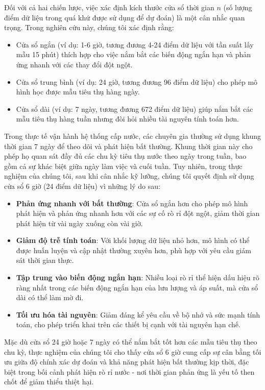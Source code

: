 Đối với cả hai chiến lược, việc xác định kích thước cửa sổ thời gian $n$ (số lượng điểm dữ liệu trong quá khứ được sử dụng để dự đoán) là một cân nhắc quan trọng. Trong nghiên cứu này, chúng tôi xác định rằng:

\begin{itemize}
    \item Cửa sổ ngắn (ví dụ: 1-6 giờ, tương đương 4-24 điểm dữ liệu với tần suất lấy mẫu 15 phút) thích hợp cho việc nắm bắt các biến động ngắn hạn và phản ứng nhanh với các thay đổi đột ngột.
    \item Cửa sổ trung bình (ví dụ: 24 giờ, tương đương 96 điểm dữ liệu) cho phép mô hình học được mẫu tiêu thụ hàng ngày.
    \item Cửa sổ dài (ví dụ: 7 ngày, tương đương 672 điểm dữ liệu) giúp nắm bắt các mẫu tiêu thụ hàng tuần nhưng đòi hỏi nhiều tài nguyên tính toán hơn.
\end{itemize}

Trong thực tế vận hành hệ thống cấp nước, các chuyên gia thường sử dụng khung thời gian 7 ngày để theo dõi và phát hiện bất thường. Khung thời gian này cho phép họ quan sát đầy đủ các chu kỳ tiêu thụ nước theo ngày trong tuần, bao gồm cả sự khác biệt giữa ngày làm việc và cuối tuần. Tuy nhiên, trong thực nghiệm của chúng tôi, sau khi cân nhắc kỹ lưỡng, chúng tôi quyết định sử dụng cửa sổ 6 giờ (24 điểm dữ liệu) vì những lý do sau:

\begin{itemize}
    \item \textbf{Phản ứng nhanh với bất thường}: Cửa sổ ngắn hơn cho phép mô hình phát hiện và phản ứng nhanh hơn với các sự cố rò rỉ đột ngột, giảm thời gian phát hiện từ vài ngày xuống còn vài giờ.
    \item \textbf{Giảm độ trễ tính toán}: Với khối lượng dữ liệu nhỏ hơn, mô hình có thể được huấn luyện và cập nhật thường xuyên hơn, phù hợp với yêu cầu giám sát thời gian thực.
    \item \textbf{Tập trung vào biến động ngắn hạn}: Nhiều loại rò rỉ thể hiện dấu hiệu rõ ràng nhất trong các biến động ngắn hạn của lưu lượng và áp suất, mà cửa sổ dài có thể làm mờ đi.
    \item \textbf{Tối ưu hóa tài nguyên}: Giảm đáng kể yêu cầu về bộ nhớ và sức mạnh tính toán, cho phép triển khai trên các thiết bị cạnh với tài nguyên hạn chế.
\end{itemize}

Mặc dù cửa sổ 24 giờ hoặc 7 ngày có thể nắm bắt tốt hơn các mẫu tiêu thụ theo chu kỳ, thực nghiệm của chúng tôi cho thấy cửa sổ 6 giờ cung cấp sự cân bằng tối ưu giữa độ chính xác dự đoán và khả năng phát hiện bất thường kịp thời, đặc biệt trong bối cảnh phát hiện rò rỉ nước - nơi thời gian phản ứng là yếu tố then chốt để giảm thiểu thiệt hại.

